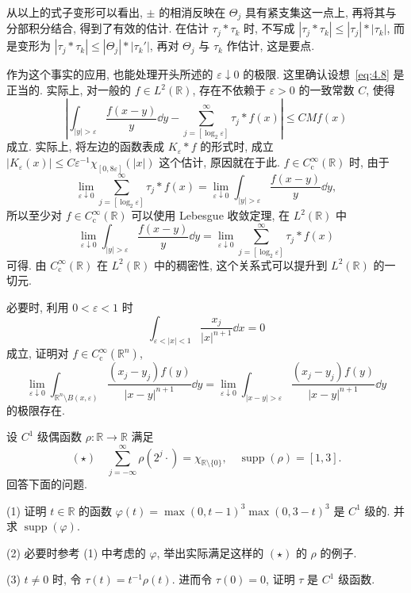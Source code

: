 从以上的式子变形可以看出, $\pm$ 的相消反映在 $\Theta_{j}$ 具有紧支集这一点上, 再将其与分部积分结合, 得到了有效的估计. 在估计 $\tau_{j} * \tau_{k}$ 时, 不写成 $|\tau_{j} * \tau_{k}| \leq |\tau_{j}| * |\tau_{k}|$, 而是变形为 $|\tau_{j} * \tau_{k}| \leq |\Theta_{j}| * |\tau_{k}'|$, 再对 $\Theta_{j}$ 与 $\tau_{k}$ 作估计, 这是要点.

作为这个事实的应用, 也能处理开头所述的 $\varepsilon \downarrow 0$ 的极限. 这里确认设想~\eqref{eq:4.8} 是正当的. 实际上, 对一般的 $f \in L^{2}(\mathbb{R})$, 存在不依赖于 $\varepsilon > 0$ 的一致常数 $C$, 使得
\[
\left|\int_{|y| > \varepsilon}\frac{f(x-y)}{y}\dd y - \sum_{j=[\log_{2}\varepsilon]}^{\infty}\tau_{j} * f(x)\right| \leq CMf(x)
\]
成立. 实际上, 将左边的函数表成 $K_{\varepsilon} * f$ 的形式时, 成立 $|K_{\varepsilon}(x)| \leq C\varepsilon^{-1}\chi_{[0,8\varepsilon]}(|x|)$ 这个估计, 原因就在于此. $f \in C_{\mathrm{c}}^{\infty}(\mathbb{R})$ 时, 由于
\[
\lim_{\varepsilon \downarrow 0}\sum_{j=[\log_{2}\varepsilon]}^{\infty}\tau_{j} * f(x) = \lim_{\varepsilon \downarrow 0}\int_{|y| > \varepsilon}\frac{f(x-y)}{y}\dd y,
\]
所以至少对 $f \in C_{\mathrm{c}}^{\infty}(\mathbb{R})$ 可以使用 Lebesgue 收敛定理, 在 $L^{2}(\mathbb{R})$ 中
\[
\lim_{\varepsilon \downarrow 0}\int_{|y| > \varepsilon}\frac{f(x-y)}{y}\dd y = \lim_{\varepsilon \downarrow 0}\sum_{j=[\log_{2}\varepsilon]}^{\infty}\tau_{j} * f(x)
\]
可得. 由 $C_{\mathrm{c}}^{\infty}(\mathbb{R})$ 在 $L^{2}(\mathbb{R})$ 中的稠密性, 这个关系式可以提升到 $L^{2}(\mathbb{R})$ 的一切元.

\begin{exercise}\label{exer:4.2}
必要时, 利用 $0 < \varepsilon < 1$ 时
\[
\int_{\varepsilon < |x| < 1}\frac{x_{j}}{|x|^{n+1}}\dd x = 0
\]
成立, 证明对 $f \in C_{\mathrm{c}}^{\infty}(\mathbb{R}^{n})$,
\[
\lim_{\varepsilon \downarrow 0}\int_{\mathbb{R}^{n}\setminus B(x, \varepsilon)}\frac{(x_{j}-y_{j})f(y)}{|x-y|^{n+1}}\dd y = \lim_{\varepsilon \downarrow 0}\int_{|x-y| > \varepsilon}\frac{(x_{j}-y_{j})f(y)}{|x-y|^{n+1}}\dd y
\]
的极限存在.
\end{exercise}

\begin{exercise}\label{exer:4.3}
设 $C^{1}$ 级偶函数 $\rho: \mathbb{R} \to \mathbb{R}$ 满足
\[
(\star)\quad \sum_{j=-\infty}^{\infty}\rho(2^{j}\cdot) = \chi_{\mathbb{R}\setminus\{0\}}, \quad \operatorname{supp}(\rho) = [1, 3].
\]
回答下面的问题.

(1) 证明 $t \in \mathbb{R}$ 的函数 $\varphi(t) = \max(0, t-1)^{3}\max(0, 3-t)^{3}$ 是 $C^{1}$ 级的. 并求 $\operatorname{supp}(\varphi)$.

(2) 必要时参考 (1) 中考虑的 $\varphi$, 举出实际满足这样的 $(\star)$ 的 $\rho$ 的例子.

(3) $t \neq 0$ 时, 令 $\tau(t) = t^{-1}\rho(t)$. 进而令 $\tau(0) = 0$, 证明 $\tau$ 是 $C^{1}$ 级函数.
\end{exercise}

